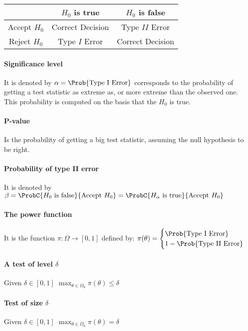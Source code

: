 \begin{tabular}{|c|c|c|}
	\hline
	& $H_{0}$ is true & $H_{0}$ is false\\
	\hline
	Accept $H_{0}$ & Correct Decision & Type $II$ Error\\
	\hline
	Reject $H_{0}$ & Type $I$ Error & Correct Decision\\
	\hline
\end{tabular}

\paragraph{Significance level}
It is denoted by $\alpha = \Prob{\text{Type I Error}}$ corresponds to
the probability of getting a test statistic as extreme as, or more 
extreme than the observed one. This probability is computed on the 
basis that the $H_{0}$ is true.

\paragraph{P-value}
Is the probability of getting a big test statistic, assuming the null
hypothesis to be right.
\paragraph{Probability of type II error}
It is denoted by $\beta = \ProbC{H_{0}\text{ is false}}{\text{Accept }H_{0}} = \ProbC{H_{\alpha}\text{ is true}}{\text{Accept }H_{0}}$ 

\paragraph{The power function}
It is the function $\pi : \Omega\rightarrow [0,1]$ defined by:
$
\pi(\theta)=
\begin{cases}
	\Prob{\text{Type I Error}}\\
	1-\Prob{\text{Type II Error}}
\end{cases}
$

\paragraph{A test of level $\delta$} Given $\delta\in[0,1]$
$\max_{\theta\in\Omega_{0}}\pi(\theta)\leq\delta$
\paragraph{Test of size $\delta$} Given $\delta\in[0,1]$
$\max_{\theta\in\Omega_{0}}\pi(\theta)=\delta$
